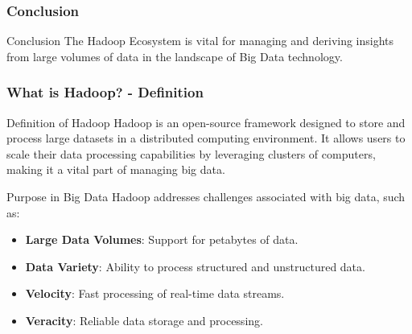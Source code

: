 \documentclass[aspectratio=169]{beamer}
\begin{document}
\begin{frame}[fragile]
    \frametitle{Conclusion}
    \begin{block}{Conclusion}
        The Hadoop Ecosystem is vital for managing and deriving insights from large volumes of data in the landscape of Big Data technology.
    \end{block}
\end{frame}

\begin{frame}[fragile]
    \frametitle{What is Hadoop? - Definition}
    
    \begin{block}{Definition of Hadoop}
        Hadoop is an open-source framework designed to store and process large datasets in a distributed computing environment. It allows users to scale their data processing capabilities by leveraging clusters of computers, making it a vital part of managing big data. 
    \end{block}

    \begin{block}{Purpose in Big Data}
        Hadoop addresses challenges associated with big data, such as:
        \begin{itemize}
            \item \textbf{Large Data Volumes}: Support for petabytes of data.
            \item \textbf{Data Variety}: Ability to process structured and unstructured data.
            \item \textbf{Velocity}: Fast processing of real-time data streams.
            \item \textbf{Veracity}: Reliable data storage and processing.
        \end{itemize}
    \end{block}
\end{frame}
\end{document}

